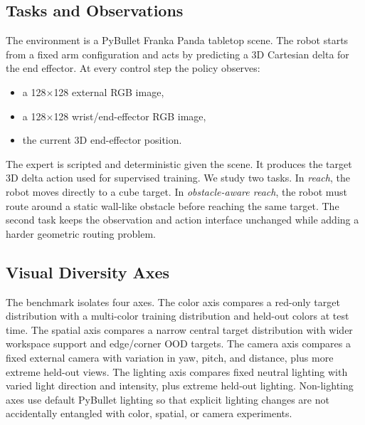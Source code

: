 \documentclass[10pt,twocolumn,letterpaper]{article}
\begin{document}
\subsection{Tasks and Observations}
The environment is a PyBullet Franka Panda tabletop scene. The robot starts from a fixed arm configuration and acts by predicting a 3D Cartesian delta for the end effector. At every control step the policy observes:
\begin{itemize}
\item a 128$\times$128 external RGB image,
\item a 128$\times$128 wrist/end-effector RGB image,
\item the current 3D end-effector position.
\end{itemize}
The expert is scripted and deterministic given the scene. It produces the target 3D delta action used for supervised training. We study two tasks. In \emph{reach}, the robot moves directly to a cube target. In \emph{obstacle-aware reach}, the robot must route around a static wall-like obstacle before reaching the same target. The second task keeps the observation and action interface unchanged while adding a harder geometric routing problem.

\subsection{Visual Diversity Axes}
The benchmark isolates four axes. The color axis compares a red-only target distribution with a multi-color training distribution and held-out colors at test time. The spatial axis compares a narrow central target distribution with wider workspace support and edge/corner OOD targets. The camera axis compares a fixed external camera with variation in yaw, pitch, and distance, plus more extreme held-out views. The lighting axis compares fixed neutral lighting with varied light direction and intensity, plus extreme held-out lighting. Non-lighting axes use default PyBullet lighting so that explicit lighting changes are not accidentally entangled with color, spatial, or camera experiments.

\begin{table}[t]
\centering
\footnotesize
{}
\caption{Collected dataset scale. Training includes budgets 5/20/50 with seeds 0/1/2 and high-budget 100/200 with seed 0. Each timestep has external and wrist RGB images.}
\label{tab:dataset-scale}
\end{table}
\end{document}
